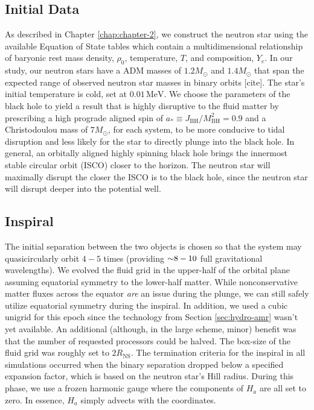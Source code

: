 \subsection{Initial Data} As described in Chapter \ref{chap:chapter-2}, we construct the neutron star using the available Equation of State tables which contain a multidimensional relationship of baryonic rest mass density, $\rho_0$, temperature, $T$, and composition, $Y_e$.  In our study, our neutron stars have a ADM masses of $1.2 M_\odot$ and $1.4 M_\odot$ that span the expected range of observed neutron star masses in binary orbits [cite].  The star's initial temperature is cold, set at $0.01\,\textrm{MeV}$.  We choose the parameters of the black hole to yield a result that is highly disruptive to the fluid matter by prescribing a high prograde aligned spin of $a_* \equiv J_\textrm{BH}/M_\textrm{BH}^2 = 0.9$ and a Christodoulou mass of $7 M_\odot$, for each system, to be more conducive to tidal disruption and less likely for the star to directly plunge into the black hole.
In general, an orbitally aligned highly spinning black hole brings the innermost stable circular orbit (ISCO) closer to the horizon.
The neutron star will maximally disrupt the closer the ISCO is to the black hole, since the  neutron star will disrupt deeper into the potential well.

\subsection{Inspiral}
The initial separation between the two objects is chosen so that the system may quasicircularly orbit $4-5$ times (providing $\mathord{\sim} 8-10$ full gravitational wavelengths).  
We evolved the fluid grid in the upper-half of the orbital plane assuming equatorial symmetry to the lower-half matter.  While nonconservative matter fluxes across the equator \textit{are} an issue during the plunge, we can still safely utilize equatorial symmetry during the inspiral.  
In addition, we used a cubic unigrid for this epoch since the technology from Section \ref{sec:hydro-amr} wasn't yet available.
An additional (although, in the large scheme, minor) benefit was that the number of requested processors could be halved.  
The box-size of the fluid grid was roughly set to $2 R_\textrm{NS}$.  
The termination criteria for the inspiral in all simulations occurred when the binary separation dropped below a specified expansion factor, which is based on the neutron star's Hill radius.
During this phase, we use a frozen harmonic gauge where the components of $H_a$ are all set to zero.  
In essence, $H_a$ simply advects with the coordinates.
	

